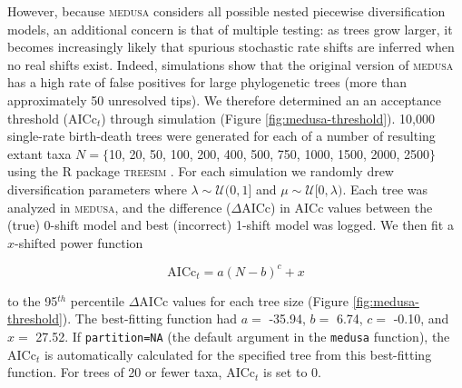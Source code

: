 However, because \textsc{medusa} considers all possible nested piecewise diversification models, an additional concern is that of multiple testing: as trees grow larger, it becomes increasingly likely that spurious stochastic rate shifts are inferred when no real shifts exist. Indeed, simulations show that the original version of \textsc{medusa} has a high rate of false positives for large phylogenetic trees (more than approximately 50 unresolved tips). We therefore determined an an acceptance threshold (AICc$_t$) through simulation (Figure \ref{fig:medusa-threshold}). 10,000 single-rate birth-death trees were generated for each of a number of resulting extant taxa $N = \lbrace$10, 20, 50, 100, 200, 400, 500, 750, 1000, 1500, 2000, 2500$\rbrace$ using the R package \textsc{treesim} \citep{treesim}. For each simulation we randomly drew diversification parameters where $\lambda \sim \mathcal{U}(0,1]$ and $\mu \sim \mathcal{U}[0, \lambda)$. Each tree was analyzed in \textsc{medusa}, and the difference ($\Delta$AICc) in AICc values between the (true) 0-shift model and best (incorrect) 1-shift model was logged. We then fit a $x$-shifted power function

\begin{equation}
\mathrm{AICc}_{t} = a (N - b)^{c} + x 
\end{equation}

to the 95$^{th}$ percentile $\Delta$AICc values for each tree size (Figure \ref{fig:medusa-threshold}). The best-fitting function had $a =$ -35.94, $b =$ 6.74, $c =$ -0.10, and $x =$ 27.52. If \texttt{partition=NA} (the default argument in the \texttt{medusa} function), the AICc$_{t}$ is automatically calculated for the specified tree from this best-fitting function. For trees of 20 or fewer taxa, AICc$_{t}$ is set to 0.

